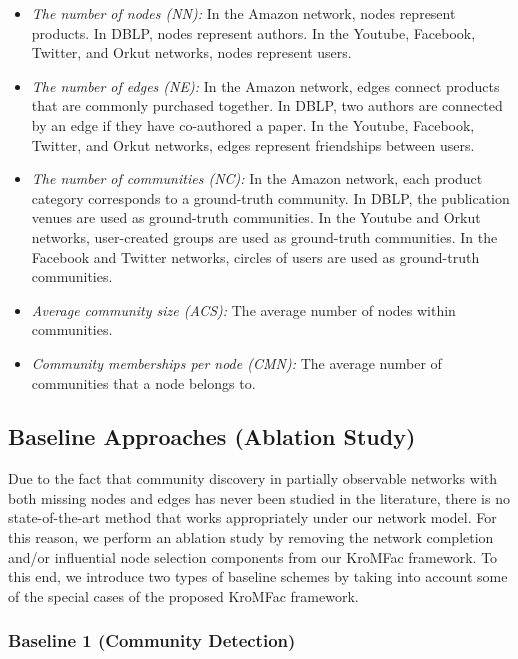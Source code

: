 \documentclass[format=acmsmall, review=false, screen=true]{acmart}
\begin{document}
\begin{itemize}
\item {\em The number of nodes (NN):} In the Amazon network, nodes represent products. In DBLP, nodes represent authors. In the Youtube, Facebook, Twitter, and Orkut networks, nodes represent users.
\item {\em The number of edges (NE):} In the Amazon network, edges connect products that are commonly purchased together. In DBLP, two authors are connected by an edge if they have co-authored a paper. In the Youtube, Facebook, Twitter, and Orkut networks, edges represent friendships between users.
\item {\em The number of communities (NC):} In the Amazon network, each product category corresponds to a ground-truth community. In DBLP, the publication venues are used as ground-truth communities. In the Youtube and Orkut networks, user-created groups are used as ground-truth communities. In the Facebook and Twitter networks, circles of users are used as ground-truth communities.
\item {\em Average community size (ACS):} The average number of nodes within communities.
\item {\em Community memberships per node (CMN):} The average number of communities that a node belongs to.
\end{itemize}


\subsection{Baseline Approaches (Ablation Study)}\label{sec:4b}

Due to the fact that community discovery in partially observable networks with both missing nodes and edges has never been studied in the literature, there is no state-of-the-art method that works appropriately under our network model. For this reason, we perform an ablation study by removing the network completion and/or influential node selection components from our \textsf{KroMFac} framework. To this end, we introduce two types of baseline schemes by taking into account some of the special cases of the proposed \textsf{KroMFac} framework.

\subsubsection{Baseline 1 (Community Detection)} 
\end{document}
